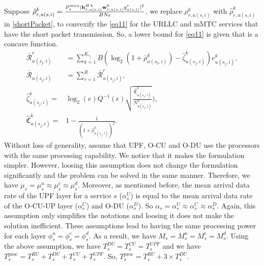 \documentclass[lettersize,journal]{IEEEtran}
\begin{document}
Suppose $\hat{\rho}_{r,u(s,i)}^{k} =  \frac{P_{s}^{max}|{\bold{h}_{r,u(s,i)}^{H \: k}} \bold{w}_{r,u(s,i)}^{k} g_{u(s,i)}^r|^2}{BN_0}$.
we replace ${\rho}_{r,u(s,i)}^{k}$ with $\hat{\rho}_{r,u(s,i)}^{k}$ in \eqref{shortPacket}, to convexify the \eqref{eq11} for the URLLC and mMTC services that have the short packet transmission.
So, a lower bound for \eqref{eq11} is given that is a concave function.
\begin{subequations}\label{lb1}
\begin{alignat}{4}
\bar{\mathcal{R}}_{u(s_j,i)}^{r} &= \sum_{k=1}^{K_{s_j}} B (\log_2({1+ \bar{\rho}_{u(s_2,i)}^{k}})- \hat{\zeta}_{u(s_j,i)}^{k}){e}_{u(s_j,i)}^{k},\\
\bar{\mathcal{R}}_{u(s_j,i)} &= \sum_{r=1}^{R}\bar{\mathcal{R}}_{u(s_j,i)}^{r},\\
 \hat{\zeta}_{u(s_j,i)}^{k} =& \log_2({e})Q^{-1}(\epsilon) \sqrt{\frac{\hat{\mathfrak{C}}_{u(s_j,i)}^{k}}{N_{u(s_j,i)}^{k}}}),\\
 \hat{\mathfrak{C}}_{u(s_j,i)}^{k} =& 1 - \frac{1}{(1+\hat{\rho}_{u(s_j,i)}^{k})^2}.
\end{alignat}
\end{subequations}
Without loss of generality, assume that UPF, O-CU and O-DU use the processors with the same processing capability. We notice that it makes the formulation simpler. However, loosing this assumption does not change the formulation significantly and the problem can be solved in the same manner. Therefore, we have $\mu_s = \mu_s^u \approx \mu_s^c \approx \mu_s^d $. Moreover, as mentioned before,
the mean arrival data rate of the UPF layer for a service $s$ ($\alpha_{s}^U$) is equal to the mean arrival data rate of the O-CU-UP layer ($\alpha_{s}^C$) and O-DU ($\alpha_{s}^D$). So $\alpha_{s} =\alpha_{s}^U \approx \alpha_{s}^C \approx \alpha_{s}^D$. Again, this assumption only simplifies the notations and loosing it does not make the solution inefficient.
These assumptions lead to having the same processing power for each layer $\phi_s^u = \phi_s^c =\phi_s^d $.
As a result, we have $M_s = M_s^u = M_s^c = M_s^d $.
Using the above assumption, we have $T^{DU}_{s} = T^{CU}_{s} = T^{UPF}_{s}$ and we have
$T^{\text{proc}}_{s} =  T^{RU}_{s} + T^{DU}_{s} + T^{CU}_{s} + T^{UPF}_{s}$. So,
$T^{\text{proc}}_{s}=  T^{RU}_{s} + 3\times T^{DU}_{s}.$
\end{document}
